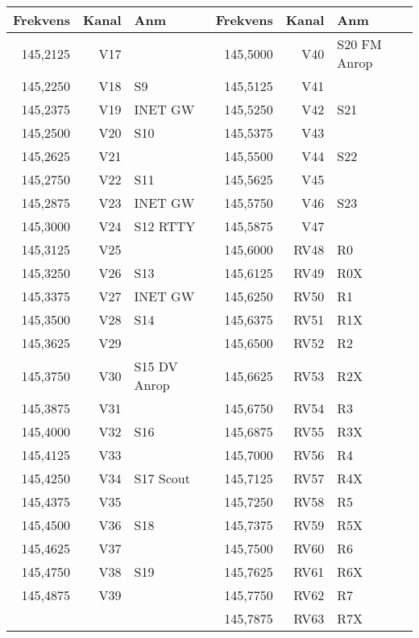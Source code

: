 \begin{longtable}{rrl|rrl}

\textbf{Frekvens} & \textbf{Kanal} & \textbf{Anm} &
\textbf{Frekvens} & \textbf{Kanal} & \textbf{Anm} \\ \hline

145,2125 & V17 &              & 145,5000 & V40  & S20  FM Anrop \\
145,2250 & V18 & S9           & 145,5125 & V41  &               \\
145,2375 & V19 & INET GW      & 145,5250 & V42  & S21           \\
145,2500 & V20 & S10          & 145,5375 & V43  &               \\
145,2625 & V21 &              & 145,5500 & V44  & S22           \\
145,2750 & V22 & S11          & 145,5625 & V45  &               \\
145,2875 & V23 & INET GW      & 145,5750 & V46  & S23           \\
145,3000 & V24 & S12  RTTY    & 145,5875 & V47  &               \\
145,3125 & V25 &              & 145,6000 & RV48 & R0            \\
145,3250 & V26 & S13          & 145,6125 & RV49 & R0X           \\
145,3375 & V27 & INET GW      & 145,6250 & RV50 & R1            \\
145,3500 & V28 & S14          & 145,6375 & RV51 & R1X           \\
145,3625 & V29 &              & 145,6500 & RV52 & R2            \\
145,3750 & V30 & S15 DV Anrop & 145,6625 & RV53 & R2X           \\
145,3875 & V31 &              & 145,6750 & RV54 & R3            \\
145,4000 & V32 & S16          & 145,6875 & RV55 & R3X           \\
145,4125 & V33 &              & 145,7000 & RV56 & R4            \\
145,4250 & V34 & S17 Scout    & 145,7125 & RV57 & R4X           \\
145,4375 & V35 &              & 145,7250 & RV58 & R5            \\
145,4500 & V36 & S18          & 145,7375 & RV59 & R5X           \\
145,4625 & V37 &              & 145,7500 & RV60 & R6            \\
145,4750 & V38 & S19          & 145,7625 & RV61 & R6X           \\
145,4875 & V39 &              & 145,7750 & RV62 & R7            \\
         &     &              & 145,7875 & RV63 & R7X
\end{longtable}

